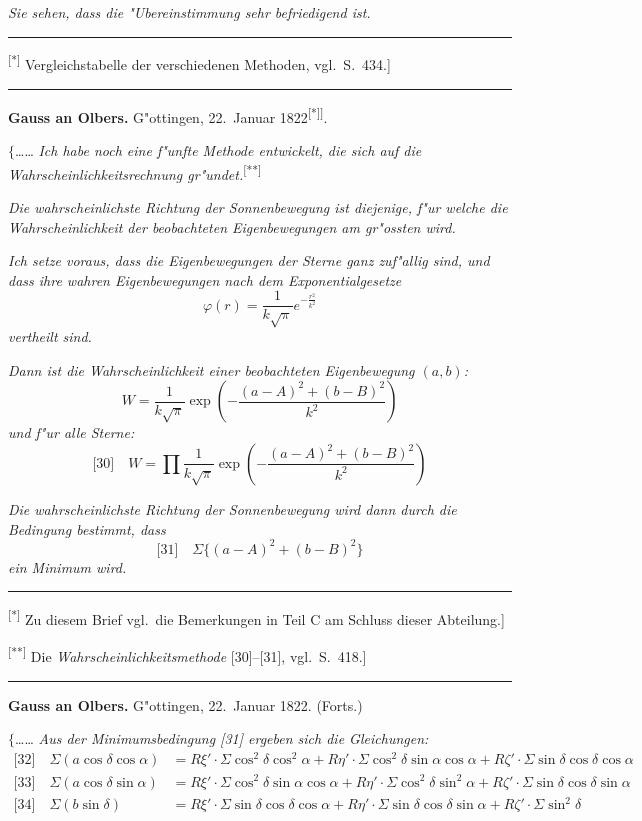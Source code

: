 \documentclass[12pt,a4paper]{article}
\theoremstyle{plain}
\theoremstyle{definition}
\theoremstyle{remark}
\begin{document}
{\itshape Sie sehen, dass die "Ubereinstimmung sehr befriedigend ist.}

\rule{\textwidth}{0.4pt}
{\small
\textsuperscript{[*]} Vergleichstabelle der verschiedenen Methoden, vgl.\ S.\ 434.]
}
\rule{\textwidth}{0.4pt}

\vspace{1em}
\begin{center}
\textbf{Gauss an Olbers.} \quad G"ottingen, 22.\ Januar 1822\textsuperscript{[*]]}.
\end{center}

\noindent
$\{$\ldots{}\ldots{} {\itshape Ich habe noch eine f"unfte Methode entwickelt, die sich auf die} \\ {\itshape Wahrscheinlichkeitsrechnung gr"undet.}\textsuperscript{[**]}

{\itshape Die wahrscheinlichste Richtung der Sonnenbewegung ist diejenige, f"ur welche die Wahrscheinlichkeit der beobachteten Eigenbewegungen am gr"ossten wird.}

{\itshape Ich setze voraus, dass die Eigenbewegungen der Sterne ganz zuf"allig sind, und dass ihre wahren Eigenbewegungen nach dem Exponentialgesetze}
\[
\varphi(r) = \frac{1}{k\sqrt{\pi}}e^{-\frac{r^2}{k^2}}
\]
{\itshape vertheilt sind.}

{\itshape Dann ist die Wahrscheinlichkeit einer beobachteten Eigenbewegung $(a, b)$:}
\[
W = \frac{1}{k\sqrt{\pi}}\exp\left(-\frac{(a - A)^2 + (b - B)^2}{k^2}\right)
\]
{\itshape und f"ur alle Sterne:}
\[
\text{[30]}\quad W = \prod \frac{1}{k\sqrt{\pi}}\exp\left(-\frac{(a - A)^2 + (b - B)^2}{k^2}\right)
\]

{\itshape Die wahrscheinlichste Richtung der Sonnenbewegung wird dann durch die Bedingung bestimmt, dass}
\[
\text{[31]}\quad \Sigma\{(a - A)^2 + (b - B)^2\}
\]
{\itshape ein Minimum wird.}

\rule{\textwidth}{0.4pt}
{\small
\textsuperscript{[*]} Zu diesem Brief vgl.\ die Bemerkungen in Teil C am Schluss dieser Abteilung.]

\textsuperscript{[**]} Die {\itshape Wahrscheinlichkeitsmethode} [30]--[31], vgl.\ S.\ 418.]
}
\rule{\textwidth}{0.4pt}


\newpage
\begin{center}
\textbf{Gauss an Olbers.} \quad G"ottingen, 22.\ Januar 1822. (Forts.)
\end{center}

\noindent
$\{$\ldots{}\ldots{} {\itshape Aus der Minimumsbedingung [31] ergeben sich die Gleichungen:}
\begin{align*}
\text{[32]}\quad \Sigma(a\cos\delta\cos\alpha) &= R\xi'\cdot\Sigma\cos^2\delta\cos^2\alpha + R\eta'\cdot\Sigma\cos^2\delta\sin\alpha\cos\alpha + R\zeta'\cdot\Sigma\sin\delta\cos\delta\cos\alpha\\
\text{[33]}\quad \Sigma(a\cos\delta\sin\alpha) &= R\xi'\cdot\Sigma\cos^2\delta\sin\alpha\cos\alpha + R\eta'\cdot\Sigma\cos^2\delta\sin^2\alpha + R\zeta'\cdot\Sigma\sin\delta\cos\delta\sin\alpha\\
\text{[34]}\quad \Sigma(b\sin\delta) &= R\xi'\cdot\Sigma\sin\delta\cos\delta\cos\alpha + R\eta'\cdot\Sigma\sin\delta\cos\delta\sin\alpha + R\zeta'\cdot\Sigma\sin^2\delta
\end{align*}
\end{document}
